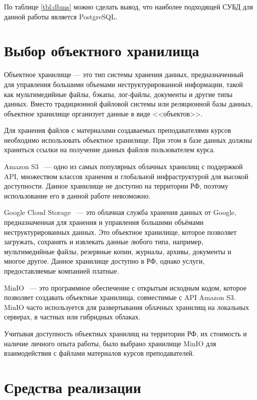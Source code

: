 По таблице \ref{tbl:dbms} можно сделать вывод, что наиболее подходящей СУБД для данной работы является PostgreSQL.

\section{Выбор объектного хранилища}

Объектное хранилище --- это тип системы хранения данных, предназначенный для управления большими объемами неструктурированной информации, такой как мультимедийные файлы, бэкапы, лог-файлы, документы и другие типы данных. Вместо традиционной файловой системы или реляционной базы данных, объектное хранилище организует данные в виде <<объектов>>.

Для хранения файлов с материалами создаваемых преподавателями курсов необходимо использовать объектное хранилище. При этом в базе данных должны храниться ссылки на получение данных файлов пользователем курса. 

Amazon S3~\cite{s3} --- одно из самых популярных облачных хранилищ с поддержкой API, множеством классов хранения и глобальной инфраструктурой для высокой доступности. Данное хранилище не доступно на территории РФ, поэтому использование его в данной работе невозможно. 

Google Cloud Storage~\cite{google-cloud} --- это облачная служба хранения данных от Google, предназначенная для хранения и управления большими объёмами неструктурированных данных. Это объектное хранилище, которое позволяет загружать, сохранять и извлекать данные любого типа, например, мультимедийные файлы, резервные копии, журналы, архивы, документы и многое другое. Данное хранилище доступно в РФ, однако услуги, предоставляемые компанией платные.

MinIO~\cite{minio} --- это программное обеспечение с открытым исходным кодом, которое позволяет создавать объектные хранилища, совместимые с API Amazon S3. MinIO часто используется для развертывания облачных хранилищ на локальных серверах, в частных или гибридных облаках. 

Учитывая доступность объектных хранилищ на территории РФ, их стоимость и наличие личного опыта работы, было выбрано хранилище MinIO для взаимодействия с файлами материалов курсов преподавателей. 

\section{Средства реализации}

